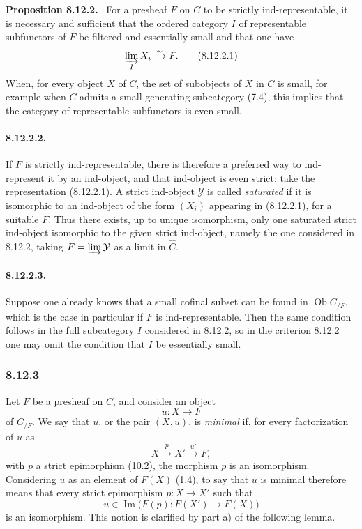 \documentclass[11pt]{article}
\newcommand{\Ob}{\operatorname{Ob}}
\newcommand{\Imn}{\operatorname{Im}}
\newenvironment{statement}[1]{\par\medskip\noindent\textbf{#1.}\ }{\par\medskip}
\begin{document}
\begin{statement}{Proposition 8.12.2}
For a presheaf $F$ on $C$ to be strictly ind-representable, it is necessary and sufficient that the ordered category $I$ of representable subfunctors of $F$ be filtered and essentially small and that one have
\[
 \varinjlim_I X_i\xrightarrow{\sim}F.
\tag{8.12.2.1}
\]
When, for every object $X$ of $C$, the set of subobjects of $X$ in $C$ is small, for example when $C$ admits a small generating subcategory (7.4), this implies that the category of representable subfunctors is even small.
\end{statement}

\paragraph{8.12.2.2.}
If $F$ is strictly ind-representable, there is therefore a preferred way to ind-represent it by an ind-object, and that ind-object is even strict: take the representation (8.12.2.1). A strict ind-object $\mathcal Y$ is called \emph{saturated} if it is isomorphic to an ind-object of the form $(X_i)$ appearing in (8.12.2.1), for a suitable $F$. Thus there exists, up to unique isomorphism, only one saturated strict ind-object isomorphic to the given strict ind-object, namely the one considered in 8.12.2, taking $F=\varinjlim\mathcal Y$ as a limit in $\widehat C$.

\paragraph{8.12.2.3.}
Suppose one already knows that a small cofinal subset can be found in $\Ob C_{/F}$, which is the case in particular if $F$ is ind-representable. Then the same condition follows in the full subcategory $I$ considered in 8.12.2, so in the criterion 8.12.2 one may omit the condition that $I$ be essentially small.

\subsubsection*{8.12.3}
Let $F$ be a presheaf on $C$, and consider an object
\[
 u:X\longrightarrow F
\]
of $C_{/F}$. We say that $u$, or the pair $(X,u)$, is \emph{minimal} if, for every factorization of $u$ as
\[
 X\xrightarrow{p}X'\xrightarrow{u'}F,
\tag{8.12.3.1}
\]
with $p$ a strict epimorphism (10.2), the morphism $p$ is an isomorphism. Considering $u$ as an element of $F(X)$ (1.4), to say that $u$ is minimal therefore means that every strict epimorphism $p:X\to X'$ such that
\[
 u\in\Imn\bigl(F(p):F(X')\to F(X)\bigr)
\]
is an isomorphism. This notion is clarified by part a) of the following lemma.
\end{document}

